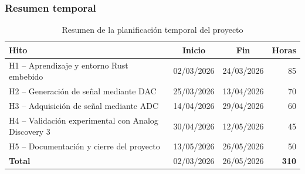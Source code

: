 \documentclass[11pt,a4paper]{article}
\begin{document}
\subsubsection{Resumen temporal}

\begin{table}[H]
\centering
\small
\begin{tabular}{lccr}
\toprule
\textbf{Hito} & \textbf{Inicio} & \textbf{Fin} & \textbf{Horas} \\
\midrule
H1 -- Aprendizaje y entorno Rust embebido & 02/03/2026 & 24/03/2026 & 85 \\
H2 -- Generación de señal mediante DAC & 25/03/2026 & 13/04/2026 & 70 \\
H3 -- Adquisición de señal mediante ADC & 14/04/2026 & 29/04/2026 & 60 \\
H4 -- Validación experimental con Analog Discovery 3 & 30/04/2026 & 12/05/2026 & 45 \\
H5 -- Documentación y cierre del proyecto & 13/05/2026 & 26/05/2026 & 50 \\
\midrule
\textbf{Total} & 02/03/2026 & 26/05/2026 & \textbf{310} \\
\bottomrule
\end{tabular}
\caption{Resumen de la planificación temporal del proyecto}
\label{tab:resumen_planificacion}
\end{table}

\clearpage
{}
\end{document}
